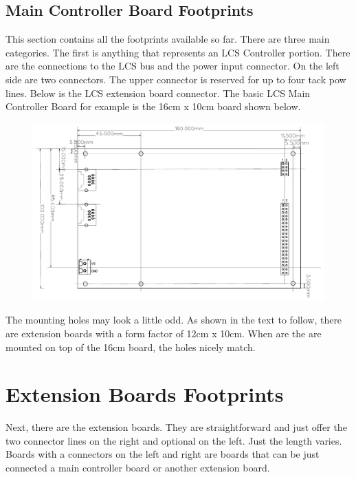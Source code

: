 \subsection{Main Controller Board Footprints}

This section contains all the footprints available so far. There are three main categories. The first is anything that represents an LCS Controller portion. There are the connections to the LCS bus and the power input connector. On the left side are two connectors. The upper connector is reserved for up to four tack pow lines. Below is the LCS extension board connector. The basic LCS Main Controller Board for example is the 16cm x 10cm board shown below.

\begin{figure}[ht]
    \centering
    \includegraphics[page=1, width=\textwidth]{./figures/LCS-FP-MAIN-CTRL-40-10X16.pdf}
\end{figure}

\FloatBarrier

The mounting holes may look a little odd. As shown in the text to follow, there are extension boards with a form factor of 12cm x 10cm. When are the are mounted on top of the 16cm board, the holes nicely match. 

\section{Extension Boards Footprints}

Next, there are the extension boards. They are straightforward and just offer the two connector lines on the right and optional on the left. Just the length varies. Boards with a connectors on the left and right are boards that can be just connected a main controller board or another extension board.  

